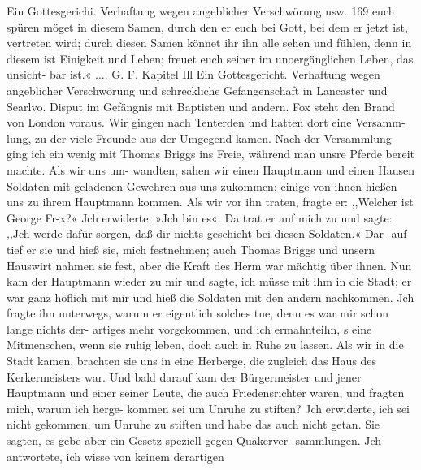 Ein Gottesgerichi. Verhaftung wegen angeblicher Verschwörung usw. 169
euch spüren möget in diesem Samen, durch den er euch bei Gott,
bei dem er jetzt ist, vertreten wird; durch diesen Samen könnet
ihr ihn alle sehen und fühlen, denn in diesem ist Einigkeit und
Leben; freuet euch seiner im unoergänglichen Leben, das unsicht-
bar ist.« .... G. F.
Kapitel Ill
Ein Gottesgericht. Verhaftung wegen angeblicher Verschwörung
und schreckliche Gefangenschaft in Lancaster und Searlvo. Disput
im Gefängnis mit Baptisten und andern. Fox steht den Brand
von London voraus.
Wir gingen nach Tenterden und hatten dort eine Versamm-
lung, zu der viele Freunde aus der Umgegend kamen. Nach der
Versammlung ging ich ein wenig mit Thomas Briggs ins Freie,
während man unsre Pferde bereit machte. Als wir uns um-
wandten, sahen wir einen Hauptmann und einen Hausen Soldaten
mit geladenen Gewehren aus uns zukommen; einige von ihnen
hießen uns zu ihrem Hauptmann kommen. Als wir vor ihn
traten, fragte er: ,,Welcher ist George Fr-x?« Jch erwiderte:
»Jch bin es«. Da trat er auf mich zu und sagte: ,,Jch werde
dafür sorgen, daß dir nichts geschieht bei diesen Soldaten.« Dar-
auf tief er sie und hieß sie, mich festnehmen; auch Thomas
Briggs und unsern Hauswirt nahmen sie fest, aber die Kraft des
Herm war mächtig über ihnen. Nun kam der Hauptmann
wieder zu mir und sagte, ich müsse mit ihm in die Stadt;
er war ganz höflich mit mir und hieß die Soldaten mit den
andern nachkommen. Jch fragte ihn unterwegs, warum er
eigentlich solches tue, denn es war mir schon lange nichts der-
artiges mehr vorgekommen, und ich ermahnteihn, s eine Mitmenschen,
wenn sie ruhig leben, doch auch in Ruhe zu lassen. Als wir in
die Stadt kamen, brachten sie uns in eine Herberge, die zugleich
das Haus des Kerkermeisters war. Und bald darauf kam der
Bürgermeister und jener Hauptmann und einer seiner Leute, die
auch Friedensrichter waren, und fragten mich, warum ich herge-
kommen sei um Unruhe zu stiften? Jch erwiderte, ich sei nicht
gekommen, um Unruhe zu stiften und habe das auch nicht getan.
Sie sagten, es gebe aber ein Gesetz speziell gegen Quäkerver-
sammlungen. Jch antwortete, ich wisse von keinem derartigen

